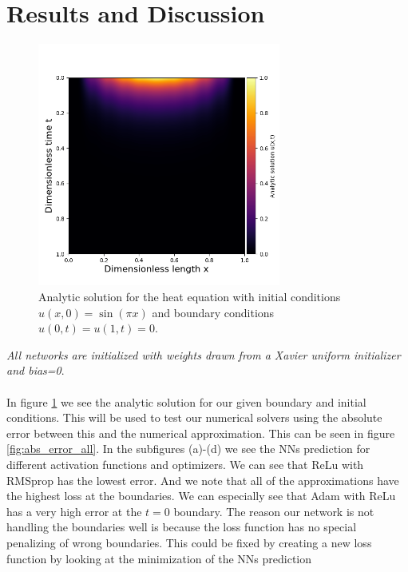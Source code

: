 \section{Results and Discussion}

\begin{figure}[h!]
    \centering
    \includegraphics[width=8cm]{../Figures/analytic_solution.png}
    \caption{Analytic solution for the heat equation with initial conditions
    $u(x,0)=\sin{(\pi x)}$ and boundary conditions $u(0,t)=u(1,t)=0$.}
    \label{fig:analytic_solution}
\end{figure}

\textit{All networks are initialized with weights drawn from a Xavier uniform
initializer and bias=0}.
\\~\\
In figure \ref{fig:analytic_solution} we see the analytic solution for our
given boundary and initial conditions. This will be used to test our numerical
solvers using the absolute error between this and the numerical approximation.
This can be seen in figure \ref{fig:abs_error_all}. In the subfigures (a)-(d)
we see the NNs prediction for different activation functions and optimizers. We
can see that ReLu with RMSprop has the lowest error. And we note that all of
the approximations have the highest loss at the boundaries. We can especially
see that Adam with ReLu has a very high error at the $t=0$ boundary. The reason
our network is not handling the boundaries well is because the loss function
has no special penalizing of wrong boundaries. This could be fixed by creating
a new loss function by looking at the minimization of the NNs prediction

